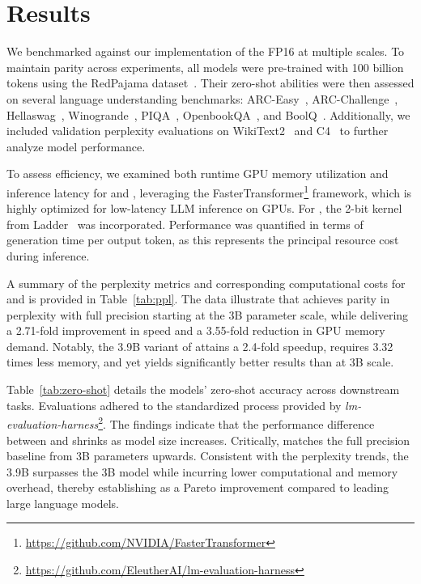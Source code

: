 \section{Results}

We benchmarked  against our implementation of the FP16  at multiple scales. To maintain parity across experiments, all models were pre-trained with 100 billion tokens using the RedPajama dataset~\cite{redpajama}. Their zero-shot abilities were then assessed on several language understanding benchmarks: ARC-Easy~\cite{arc}, ARC-Challenge~\cite{arc}, Hellaswag~\cite{hellaswag}, Winogrande~\cite{winoGrande}, PIQA~\cite{piqa}, OpenbookQA~\cite{openbookqa}, and BoolQ~\cite{boolq}. Additionally, we included validation perplexity evaluations on WikiText2~\cite{wikitext2} and C4~\cite{c4} to further analyze model performance.

To assess efficiency, we examined both runtime GPU memory utilization and inference latency for  and , leveraging the FasterTransformer\footnote{\url{https://github.com/NVIDIA/FasterTransformer}} framework, which is highly optimized for low-latency LLM inference on GPUs. For , the 2-bit kernel from Ladder~\cite{ladder} was incorporated. Performance was quantified in terms of generation time per output token, as this represents the principal resource cost during inference.

A summary of the perplexity metrics and corresponding computational costs for  and  is provided in Table~\ref{tab:ppl}. The data illustrate that  achieves parity in perplexity with full precision  starting at the 3B parameter scale, while delivering a 2.71-fold improvement in speed and a 3.55-fold reduction in GPU memory demand. Notably, the 3.9B variant of  attains a 2.4-fold speedup, requires 3.32 times less memory, and yet yields significantly better results than  at 3B scale.

Table~\ref{tab:zero-shot} details the models’ zero-shot accuracy across downstream tasks. Evaluations adhered to the standardized process provided by \emph{lm-evaluation-harness}\footnote{\url{https://github.com/EleutherAI/lm-evaluation-harness}}. The findings indicate that the performance difference between  and  shrinks as model size increases. Critically,  matches the full precision baseline from 3B parameters upwards. Consistent with the perplexity trends, the 3.9B  surpasses the 3B  model while incurring lower computational and memory overhead, thereby establishing  as a Pareto improvement compared to leading large language models.

